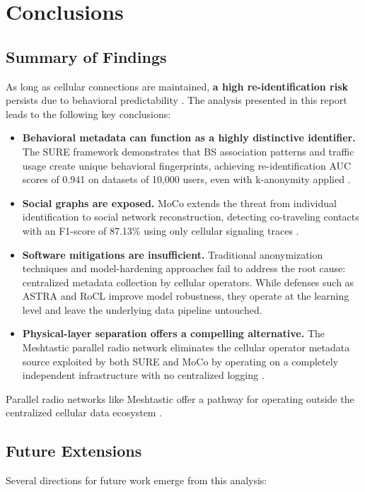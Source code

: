 \section{Conclusions}\label{sec:conclusions}

\subsection{Summary of Findings}
As long as cellular connections are maintained, \textbf{a high re-identification risk} persists due to behavioral predictability \cite{duan2025sure, duan2025moco}. The analysis presented in this report leads to the following key conclusions:

\begin{itemize}
    \item \textbf{Behavioral metadata can function as a highly distinctive identifier.} The SURE framework demonstrates that BS association patterns and traffic usage create unique behavioral fingerprints, achieving re-identification AUC scores of 0.941 on datasets of 10,000 users, even with k-anonymity applied \cite{duan2025sure}.
    \item \textbf{Social graphs are exposed.} MoCo extends the threat from individual identification to social network reconstruction, detecting co-traveling contacts with an F1-score of 87.13\% using only cellular signaling traces \cite{duan2025moco}.
    \item \textbf{Software mitigations are insufficient.} Traditional anonymization techniques and model-hardening approaches fail to address the root cause: centralized metadata collection by cellular operators. While defenses such as ASTRA \cite{chhipa2025astra} and RoCL \cite{kim2020rocl} improve model robustness, they operate at the learning level and leave the underlying data pipeline untouched.
    \item \textbf{Physical-layer separation offers a compelling alternative.} The Meshtastic parallel radio network eliminates the cellular operator metadata source exploited by both SURE and MoCo by operating on a completely independent infrastructure with no centralized logging \cite{meshtastic_overview}.
\end{itemize}

Parallel radio networks like Meshtastic offer a pathway for operating outside the centralized cellular data ecosystem \cite{meshtastic_overview}.

\subsection{Future Extensions}
Several directions for future work emerge from this analysis:

